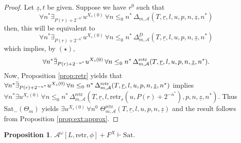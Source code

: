 \documentclass[11pt]{amsart}
\newtheorem{proposition}[theorem]{Proposition}
\theoremstyle{definition}
\theoremstyle{remark}
\begin{document}
\begin{proof}
    Let $\underline{z},t$ be given. Suppose we have $r^0$ such that
   \[
   \forall n^*\exists_{P(r)+2^{-n^*}}u^{X_s(0)}\, \forall n\le_0 n^*\, \Delta_{m,\mathcal{A}}(T,\underline{r},l,u,p,n,\underline{z},n^*)
   \]
   then, this will be equivalent to
    \[
   \forall n^*\exists_{P(r)+2^{-n^*}}u^{X_s(0)}\, \forall n\le_0 n^*\, \Delta^D_{m,\mathcal{A}}(T,\underline{r},l,u,p,n,\underline{z},n^*)
   \]
   which implies, by $(\star)$,
      \[
   \forall n^*\Bar{\exists}_{P(r)+2^{-n^*}}u^{X_s(0)}\, \forall n\le_0 n^*\, \Delta^\mathrm{retr}_{m,\mathcal{A}}(T,\underline{r},l,u,p,n,\underline{z},n^*).
   \]
    Now, Proposition \ref{prop:retr} yields that $\forall n^*\Bar{\exists}_{P(r)+2^{-n^*}}u^{X_s(0)}\, \forall n\le_0 n^*\, \Delta^\mathrm{retr}_{m,\mathcal{A}}(T,\underline{r},l,u,p,n,\underline{z},n^*)$ implies $\forall n^*\exists u^{X_s(0)}\, \forall n\le_0 n^*\, \Delta^\mathrm{retr}_{m,\mathcal{A}}(T,\underline{r},l,\mathrm{retr}_s(u,P(r)+2^{-n^*}),p,n,\underline{z},n^*)$. Thus $\mathrm{Sat}_{-}(\Theta_m)$ yields $\exists u^{X_s(0)}\, \forall n^0$  $\Theta^\mathrm{retr}_{m,\mathcal{A}}(T,\underline{r},l,u,p,n,\underline{z})$ and the result follows from Proposition \ref{prop:ext:approx}.
\end{proof}
\begin{proposition}
\label{prop:F:to:sat}
 $\mathcal{A}^\omega[L,\mathrm{retr},\phi]+F^X \vdash\mathrm{Sat}$.    
\end{proposition}
\end{document}
